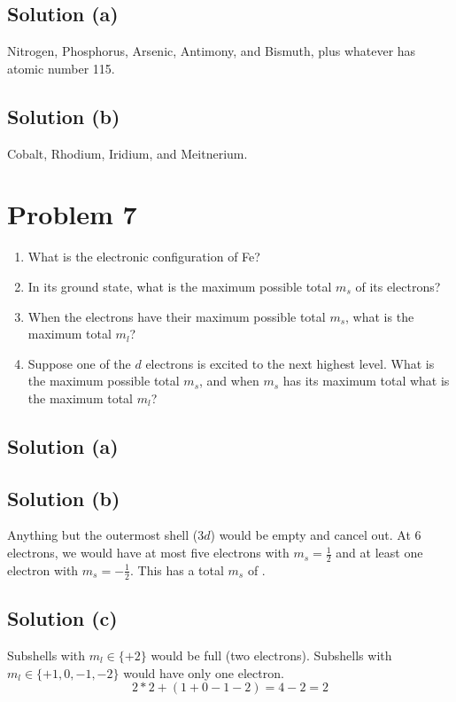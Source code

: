\documentclass[12pt]{report}
\begin{document}
\subsection{Solution (a)}
    Nitrogen, Phosphorus, Arsenic, Antimony, and Bismuth, plus whatever has atomic number 115.

\subsection{Solution (b)}
    Cobalt, Rhodium, Iridium, and Meitnerium. 
\pagebreak

\section{Problem 7}
    \begin{enumerate}[label=(\alph*)]
        \item   What is the electronic conﬁguration of Fe? 
        \item   In its ground state, what is the maximum possible total $m_s$ of its electrons? 
        \item   When the electrons have their maximum possible total $m_s$, what is the maximum total $m_l$? 
        \item   Suppose one of the $d$ electrons is excited to the next highest level.
        What is the maximum possible total $m_s$, and when $m_s$ has its maximum total what is the maximum total $m_l$?
    \end{enumerate}

    \subsection{Solution (a)}

    \subsection{Solution (b)}
        Anything but the outermost shell ($3d$) would be empty and cancel out.
        At 6 electrons, we would have at most five electrons with $m_s = \frac{1}{2}$ and at least one electron with $m_s = -\frac{1}{2}$.
        This has a total $m_s$ of .

    \subsection{Solution (c)}
        Subshells with $m_l \in \{+2\}$ would be full (two electrons).
        Subshells with $m_l \in \{+1, 0, -1, -2\}$ would have only one electron.
        \begin{equation}
            2*2 + (1 + 0 - 1 - 2) = 4 - 2 = \boxed{2}
        \end{equation}
\end{document}

